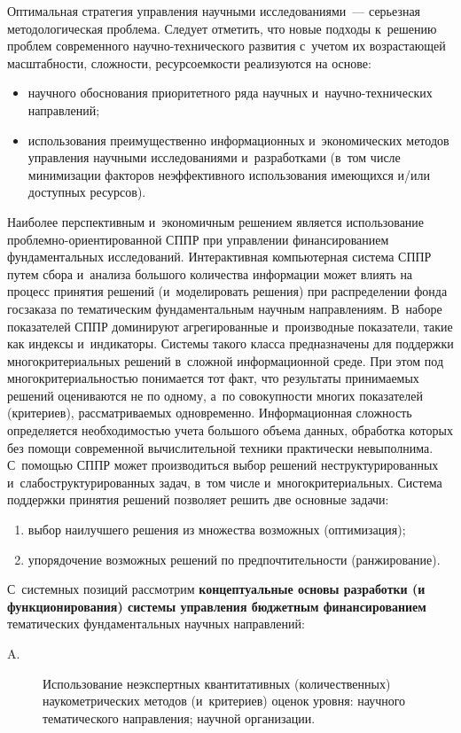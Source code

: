 \begin{multicols}{2}
     Оптимальная стратегия управления научными исследованиями~--- 
серьезная методологическая проблема. Следует отметить, что новые подходы 
к~решению проб\-лем современного на\-уч\-но-тех\-ни\-че\-ско\-го развития 
с~учетом их возрастающей масштабности, сложности, ресурсоемкости 
реализуются на основе: 
\begin{itemize}
\item научного обоснования приоритетного ряда научных 
и~на\-уч\-но-тех\-ни\-че\-ских направлений; 
\item использования 
преимущественно информационных и~экономических методов управления\linebreak 
научными исследованиями и~разработками (в~том чис\-ле минимизации 
факторов неэффективного использования имеющихся и/или доступных 
ресурсов).
\end{itemize}

 Наиболее перспективным и~экономичным решением является 
использование проб\-лем\-но-ори\-ен\-ти\-ро\-ван\-ной СППР 
при управлении финанси\-рованием 
фундаментальных исследований.  \mbox{Интерактивная} компьютерная 
система СППР путем сбора и~анализа большого количества информации 
может влиять на процесс принятия решений (и~моделировать решения) при 
распределении фонда госзаказа по тематическим фундаментальным научным 
направлениям. В~наборе показателей СППР доминируют агрегированные 
и~производные показатели, такие как индексы и~индикаторы. Сис\-те\-мы 
такого класса предназначены для поддержки многокритериальных решений 
в~слож\-ной информационной среде. При этом под многокритериальностью 
понимается тот факт, что результаты принимаемых решений оцениваются не по 
одному, а~по совокупности многих показателей (критериев), рассматриваемых 
одновременно. Информационная сложность определяется не\-об\-хо\-ди\-мостью 
учета большого объема данных, обработка которых без помощи современной 
вычислительной техники практически невыполнима. С~по\-мощью СППР 
может производиться выбор решений неструктурированных 
и~слабоструктурированных задач, в~том чис\-ле и~многокритериальных.  
Сис\-те\-ма поддержки принятия решений позволяет решить две основные задачи: 
\begin{enumerate}[(1)]
\item выбор 
наилучшего решения из множества возможных (оптимизация); 
\item упорядочение возможных решений по предпочтительности (ранжирование).
\end{enumerate}

    С~системных позиций рассмотрим \textbf{концептуальные основы 
разработки (и функционирования) сис\-те\-мы управ\-ле\-ния бюджетным 
финансированием} тематических фундаментальных научных на\-прав\-ле\-ний: 
\begin{description}
\item[A.] Использование неэкспертных квантитативных 
(количественных) наукометрических методов (и~критериев) оценок уровня: 
научного тематического на\-прав\-ле\-ния; научной организации.
    

\end{description}
\end{multicols}
